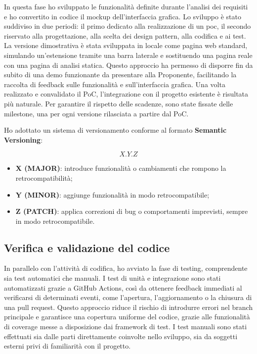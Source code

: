 \par In questa fase ho sviluppato le funzionalità definite durante l’analisi dei requisiti e ho convertito in codice il mockup dell’interfaccia grafica. Lo sviluppo è stato suddiviso in due periodi: il primo dedicato alla realizzazione di un \gls{poc}, il secondo riservato alla progettazione, alla scelta dei design pattern, alla codifica e ai test. La versione dimostrativa è stata sviluppata in locale come pagina web standard, simulando un’estensione tramite una barra laterale e sostituendo una pagina reale con una pagina di analisi statica. Questo approccio ha permesso di disporre fin da subito di una demo funzionante da presentare alla Proponente, facilitando la raccolta di feedback sulle funzionalità e sull’interfaccia grafica. Una volta realizzato e convalidato il PoC, l’integrazione con il progetto esistente è risultata più naturale. Per garantire il rispetto delle scadenze, sono state fissate delle milestone, una per ogni versione rilasciata a partire dal PoC.

\vspace{10pt}
\par\noindent Ho adottato un sistema di versionamento conforme al formato \textbf{Semantic Versioning}:

\[
X.Y.Z
\]

\begin{itemize}
  \item \textbf{X (MAJOR)}: introduce funzionalità o cambiamenti che rompono  la retrocompatibilità;
  \item \textbf{Y (MINOR)}: aggiunge funzionalità in modo retrocompatibile;
  \item \textbf{Z (PATCH)}: applica correzioni di bug o comportamenti imprevisti, sempre in modo retrocompatibile.
\end{itemize}

\subsection{Verifica e validazione del codice}

\par In parallelo con l’attività di codifica, ho avviato la fase di testing, comprendente sia test automatici che manuali. I test di unità e integrazione sono stati automatizzati grazie a GitHub Actions, così da ottenere feedback immediati al verificarsi di determinati eventi, come l’apertura, l’aggiornamento o la chiusura di una pull request. Questo approccio riduce il rischio di introdurre errori nel branch principale e garantisce una copertura uniforme del codice, grazie alle funzionalità di coverage messe a disposizione dai framework di test. I test manuali sono stati effettuati sia dalle parti direttamente coinvolte nello sviluppo, sia da soggetti esterni privi di familiarità con il progetto.

